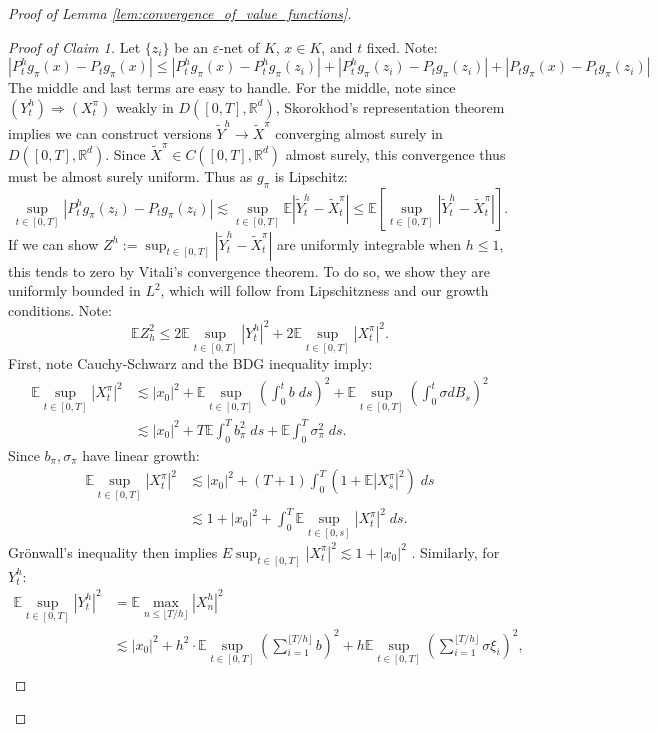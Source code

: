 \documentclass[11pt,oneside,reqno]{article}
\theoremstyle{plain}
\theoremstyle{definition}
\numberwithin{equation}{section}
\renewcommand{\leq}{\leqslant}
\newcommand{\eps}{\varepsilon}
\newcommand{\R}{\mathbb{R}}
\newcommand{\E}{\mathbb{E}}
\begin{document}
\begin{proof}[Proof of Lemma \ref{lem:convergence_of_value_functions}]
	\begin{proof}[Proof of Claim 1]
		Let $\{z_i\}$ be an $\eps$-net of $K$, $x \in K$, and $t$ fixed.  Note:
		\[|P_t^h g_\pi(x) - P_t g_\pi(x)| \leq |P_t^h g_\pi(x) - P_t^h g_\pi(z_i)| + |P_t^h g_\pi(z_i) - P_t g_\pi(z_i)| + |P_t g_\pi(x) - P_t g_\pi(z_i)|\]
		\noindent The middle and last terms are easy to handle. For the middle, note since $(Y^h_t) \Rightarrow (X^\pi_t)$ weakly in $D([0,T], \R^d)$,
		Skorokhod's representation theorem implies we can construct versions $\tilde{Y}^h \to \tilde{X}^\pi$ converging almost surely in $D([0,T], \R^d)$. Since $\tilde{X}^\pi \in C([0,T], \R^d)$ almost
		surely, this convergence thus must be almost surely uniform. Thus as $g_\pi$ is Lipschitz:
		\[\sup_{t \in [0,T]}|P_t^h g_\pi(z_i) - P_t g_\pi(z_i)| \lesssim \sup_{t\in [0,T]} \E |\tilde{Y}^h_t - \tilde{X}^\pi_t| \leq   \E \left[ \sup_{t\in [0,T]}|\tilde{Y}^h_t - \tilde{X}^\pi_t| \right].\]
		\noindent If we can show $Z^h := \sup_{t \in [0,T]} |\tilde{Y}^h_t - \tilde{X}^\pi_t|$ are uniformly integrable when $h \leq 1$, this tends to zero by Vitali's convergence theorem.
		 To do so, we show they are uniformly bounded in $L^2$, which will follow from Lipschitzness and our growth conditions. Note:
		\[\E Z_h^2 \leq 2\E \sup_{t \in [0,T]} |Y^h_t|^2 + 2\E \sup_{t \in [0,T]} |X_t^\pi|^2.\]
		\noindent First, note Cauchy-Schwarz and the BDG inequality imply:
		\begin{align*}
			\E \sup_{t \in [0,T]} |X_t^\pi|^2 & \lesssim |x_0|^2 + \E \sup_{t \in [0,T]} \left(\int_0^t b \; ds\right)^2 + \E \sup_{t \in [0,T]} \left(\int_0^t \sigma dB_s\right)^2\\
			& \lesssim |x_0|^2 + T \E \int_0^T b_\pi^2 \; ds + \E \int_0^T \sigma_\pi^2 \; ds.
		\end{align*}
		\noindent Since $b_\pi, \sigma_\pi$ have linear growth:
		\begin{align*}
			\E \sup_{t \in [0,T]} |X_t^\pi|^2 & \lesssim |x_0|^2 + (T + 1) \int_0^T (1 + \E |X^\pi_s|^2)\; ds\\
			& \lesssim 1 + |x_0|^2 + \int_0^T \E \sup_{t\in [0,s]} |X^\pi_t|^2 \; ds.
		\end{align*}
		\noindent Gr\"onwall's inequality then implies $E \sup_{t \in [0,T]} |X^\pi_t|^2 \lesssim 1 + |x_0|^2$ . Similarly, for $Y^h_t$:
		\begin{align*}
			\E \sup_{t \in [0,T]} |Y^h_t|^2 & = \E\max_{n \leq \lfloor T/ h\rfloor} |X_n^h|^2 \\ 
			& \lesssim |x_0|^2 + h^2 \cdot \E \sup_{t \in [0,T]}   \left(\sum_{i=1}^{\lfloor T/h \rfloor} b\right)^2 + h \E \sup_{t \in [0,T]} \left(\sum_{i=1}^{\lfloor T/h \rfloor} \sigma \xi_i\right)^2,\\

\end{align*}
\end{proof}
\end{proof}
\end{document}
